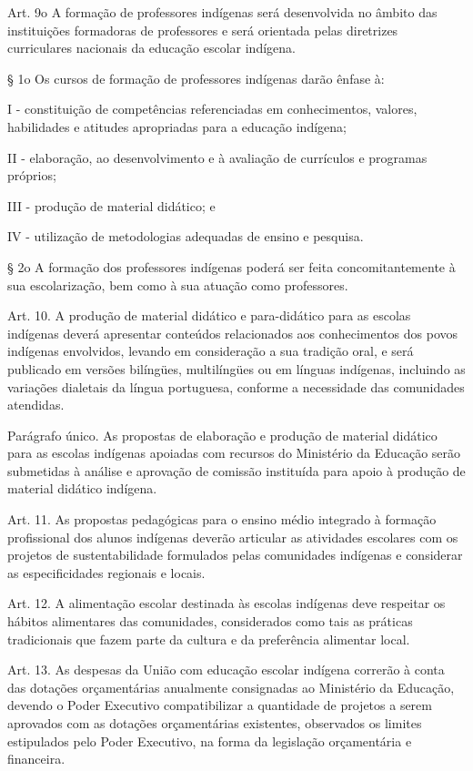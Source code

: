 \documentclass[
]{book}
\begin{document}
Art. 9o A formação de professores indígenas será desenvolvida no âmbito das instituições formadoras de professores e será orientada pelas diretrizes curriculares nacionais da educação escolar indígena.

§ 1o Os cursos de formação de professores indígenas darão ênfase à:

I - constituição de competências referenciadas em conhecimentos, valores, habilidades e atitudes apropriadas para a educação indígena;

II - elaboração, ao desenvolvimento e à avaliação de currículos e programas próprios;

III - produção de material didático; e

IV - utilização de metodologias adequadas de ensino e pesquisa.

§ 2o A formação dos professores indígenas poderá ser feita concomitantemente à sua escolarização, bem como à sua atuação como professores.

Art. 10. A produção de material didático e para-didático para as escolas indígenas deverá apresentar conteúdos relacionados aos conhecimentos dos povos indígenas envolvidos, levando em consideração a sua tradição oral, e será publicado em versões bilíngües, multilíngües ou em línguas indígenas, incluindo as variações dialetais da língua portuguesa, conforme a necessidade das comunidades atendidas.

Parágrafo único. As propostas de elaboração e produção de material didático para as escolas indígenas apoiadas com recursos do Ministério da Educação serão submetidas à análise e aprovação de comissão instituída para apoio à produção de material didático indígena.

Art. 11. As propostas pedagógicas para o ensino médio integrado à formação profissional dos alunos indígenas deverão articular as atividades escolares com os projetos de sustentabilidade formulados pelas comunidades indígenas e considerar as especificidades regionais e locais.

Art. 12. A alimentação escolar destinada às escolas indígenas deve respeitar os hábitos alimentares das comunidades, considerados como tais as práticas tradicionais que fazem parte da cultura e da preferência alimentar local.

Art. 13. As despesas da União com educação escolar indígena correrão à conta das dotações orçamentárias anualmente consignadas ao Ministério da Educação, devendo o Poder Executivo compatibilizar a quantidade de projetos a serem aprovados com as dotações orçamentárias existentes, observados os limites estipulados pelo Poder Executivo, na forma da legislação orçamentária e financeira.
\end{document}
